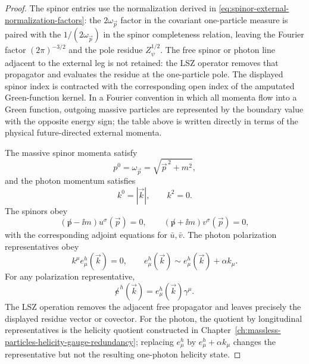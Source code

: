 \begin{proof}
The spinor entries use the normalization derived in
\eqref{eq:spinor-external-normalization-factors}: the \(2\omega_{\vec p}\)
factor in the covariant one-particle measure is paired with the
\(1/(2\omega_{\vec p})\) in the spinor completeness relation, leaving the
Fourier factor \((2\pi)^{-3/2}\) and the pole residue \(Z_\psi^{1/2}\).
The free spinor or photon line adjacent to the external leg is not retained:
the LSZ operator removes that propagator and evaluates the residue at the
one-particle pole. The displayed spinor index is contracted with the
corresponding open index of the amputated Green-function kernel. In a
Fourier convention in which all momenta flow into a Green function, outgoing
massive particles are represented by the boundary value with the opposite
energy sign; the table above is written directly in terms of the physical
future-directed external momenta.

The massive spinor momenta satisfy
\[
  p^0=\omega_{\vec p}=\sqrt{\vec p^{\,2}+m^2},
\]
and the photon momentum satisfies
\[
  k^0=|\vec k|,\qquad k^2=0 .
\]
The spinors obey
\[
  (\not p-\ii m)u^\sigma(\vec p)=0,\qquad
  (\not p+\ii m)v^\sigma(\vec p)=0,
\]
with the corresponding adjoint equations for \(\bar u,\bar v\). The photon
polarization representatives obey
\[
  k^\mu e_\mu^h(\vec k)=0,\qquad
  e_\mu^h(\vec k)\sim e_\mu^h(\vec k)+\alpha k_\mu .
\]
For any polarization representative,
\[
  \not e^{\,h}(\vec k)=e_\mu^h(\vec k)\gamma^\mu .
\]
The LSZ operation removes the adjacent free propagator and leaves precisely
the displayed residue vector or covector.  For the photon, the quotient by
longitudinal representatives is the helicity quotient constructed in
Chapter~\ref{ch:massless-particles-helicity-gauge-redundancy}; replacing
\(e_\mu^h\) by \(e_\mu^h+\alpha k_\mu\) changes the representative but not
the resulting one-photon helicity state.
\end{proof}

\begin{center}
\end{center}

